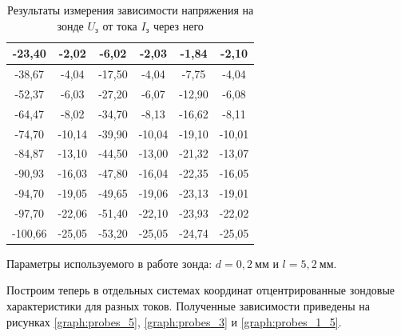 \documentclass[a4paper, 12pt]{article}
\begin{document}
\begin{table}[H]
\begin{tabular}{|cc|cc|cc|}
        \multicolumn{1}{|c|}{-23,40} & -2,02 & \multicolumn{1}{c|}{-6,02} & -2,03 & \multicolumn{1}{c|}{-1,84} & -2,10 \\ \hline
        \multicolumn{1}{|c|}{-38,67} & -4,04 & \multicolumn{1}{c|}{-17,50} & -4,04 & \multicolumn{1}{c|}{-7,75} & -4,04 \\ \hline
        \multicolumn{1}{|c|}{-52,37} & -6,03 & \multicolumn{1}{c|}{-27,20} & -6,07 & \multicolumn{1}{c|}{-12,90} & -6,08 \\ \hline
        \multicolumn{1}{|c|}{-64,47} & -8,02 & \multicolumn{1}{c|}{-34,70} & -8,13 & \multicolumn{1}{c|}{-16,62} & -8,11 \\ \hline
        \multicolumn{1}{|c|}{-74,70} & -10,14 & \multicolumn{1}{c|}{-39,90} & -10,04 & \multicolumn{1}{c|}{-19,10} & -10,01 \\ \hline
        \multicolumn{1}{|c|}{-84,87} & -13,10 & \multicolumn{1}{c|}{-44,50} & -13,00 & \multicolumn{1}{c|}{-21,32} & -13,07 \\ \hline
        \multicolumn{1}{|c|}{-90,93} & -16,03 & \multicolumn{1}{c|}{-47,80} & -16,04 & \multicolumn{1}{c|}{-22,35} & -16,05 \\ \hline
        \multicolumn{1}{|c|}{-94,70} & -19,05 & \multicolumn{1}{c|}{-49,65} & -19,06 & \multicolumn{1}{c|}{-23,13} & -19,01 \\ \hline
        \multicolumn{1}{|c|}{-97,70} & -22,06 & \multicolumn{1}{c|}{-51,40} & -22,10 & \multicolumn{1}{c|}{-23,93} & -22,02 \\ \hline
        \multicolumn{1}{|c|}{-100,66} & -25,05 & \multicolumn{1}{c|}{-53,20} & -25,05 & \multicolumn{1}{c|}{-24,74} & -25,05 \\ \hline
        \end{tabular}
        \caption{Результаты измерения зависимости напряжения на зонде $U_\text{з}$ от тока $I_\text{з}$ через него}
        \label{table:probes}
    \end{table}

    Параметры используемого в работе зонда: $d = 0,2~\text{мм}$ и $l = 5,2~\text{мм}$.

    Построим теперь в отдельных системах координат отцентрированные зондовые характеристики для разных токов. Полученные зависимости приведены на рисунках \ref{graph:probes_5}, \ref{graph:probes_3} и \ref{graph:probes_1_5}.
\end{document}
